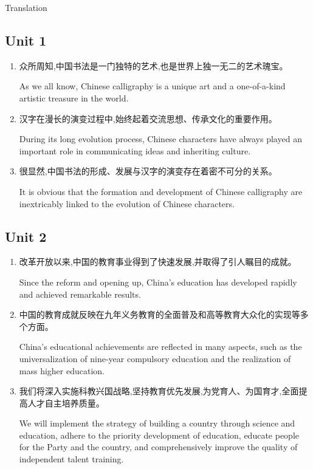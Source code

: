 
\newpage

\setcounter{section}{0}

\begin{center}
	\heiti{} Translation
\end{center}

\subsection{Unit 1}
\begin{enumerate}
	\item 众所周知,中国书法是一门独特的艺术,也是世界上独一无二的艺术瑰宝。
	
	As we all know, Chinese calligraphy is a unique art and a one-of-a-kind artistic treasure in the world.
	
	\item 汉字在漫长的演变过程中,始终起着交流思想、传承文化的重要作用。
	
	During its long evolution process, Chinese characters have always played an important role in communicating ideas and inheriting culture.
	
	
	\item 很显然,中国书法的形成、发展与汉字的演变存在着密不可分的关系。
	
	It is obvious that the formation and development of Chinese calligraphy are inextricably linked to the evolution of Chinese characters.
	
\end{enumerate}

\subsection{Unit 2}
\begin{enumerate}
	\item 改革开放以来,中国的教育事业得到了快速发展,并取得了引人瞩目的成就。
	
	Since the reform and opening up, China's education has developed rapidly and achieved remarkable results.
	
	\item 中国的教育成就反映在九年义务教育的全面普及和高等教育大众化的实现等多个方面。
	
	China's educational achievements are reflected in many aspects, such as the universalization of nine-year compulsory education and the realization of mass higher education.
	
	\item 我们将深入实施科教兴国战略,坚持教育优先发展,为党育人、为国育才,全面提高人才自主培养质量。
	
	We will implement the strategy of building a country through science and education, adhere to the priority development of education, educate people for the Party and the country, and comprehensively improve the quality of independent talent training.
	
\end{enumerate}


